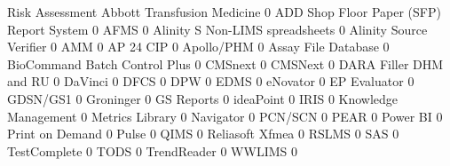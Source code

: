 \documentclass{article}
\begin{document}
\begin{Schunk}
\begin{Soutput}
                                           Risk Assessment
  Abbott Transfusion Medicine                            0
  ADD Shop Floor Paper (SFP) Report System               0
  AFMS                                                   0
  Alinity S Non-LIMS spreadsheets                        0
  Alinity Source Verifier                                0
  AMM                                                    0
  AP 24 CIP                                              0
  Apollo/PHM                                             0
  Assay File Database                                    0
  BioCommand Batch Control Plus                          0
  CMSnext                                                0
  CMSNext                                                0
  DARA Filler DHM and RU                                 0
  DaVinci                                                0
  DFCS                                                   0
  DPW                                                    0
  EDMS                                                   0
  eNovator                                               0
  EP Evaluator                                           0
  GDSN/GS1                                               0
  Groninger                                              0
  GS Reports                                             0
  ideaPoint                                              0
  IRIS                                                   0
  Knowledge Management                                   0
  Metrics Library                                        0
  Navigator                                              0
  PCN/SCN                                                0
  PEAR                                                   0
  Power BI                                               0
  Print on Demand                                        0
  Pulse                                                  0
  QIMS                                                   0
  Reliasoft Xfmea                                        0
  RSLMS                                                  0
  SAS                                                    0
  TestComplete                                           0
  TODS                                                   0
  TrendReader                                            0
  WWLIMS                                                 0
                                          

\end{Soutput}
\end{Schunk}
\end{document}
